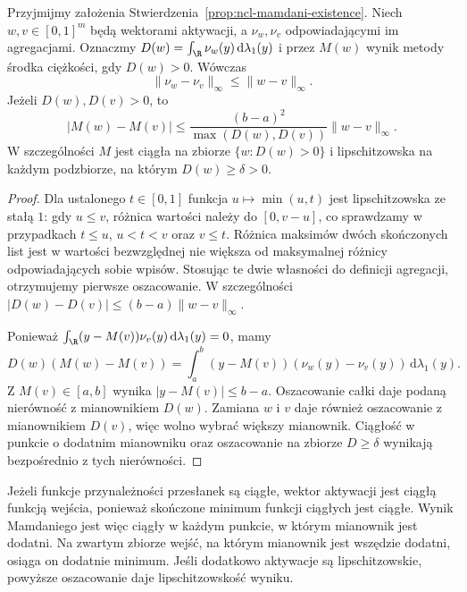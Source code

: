 \begin{twierdzenie}
\label{thm:ncl-mamdani-stability}
Przyjmijmy założenia
Stwierdzenia~\ref{prop:ncl-mamdani-existence}.
Niech $w,v\in[0,1]^m$ będą wektorami aktywacji,
a $\nu_w,\nu_v$ odpowiadającymi im agregacjami.
Oznaczmy $D(w)=\int_\R\nu_w(y)\,\mathrm d\lambda_1(y)$
i przez $M(w)$ wynik metody środka ciężkości,
gdy $D(w)>0$. Wówczas
\[
 \|\nu_w-\nu_v\|_\infty\leq\|w-v\|_\infty.
\]
Jeżeli $D(w),D(v)>0$, to
\[
 |M(w)-M(v)|
 \leq\frac{(b-a)^2}{\max(D(w),D(v))}
       \|w-v\|_\infty.
\]
W szczególności $M$ jest ciągła na zbiorze
$\{w:D(w)>0\}$ i lipschitzowska na każdym
podzbiorze, na którym $D(w)\geq\delta>0$.
\end{twierdzenie}
\begin{proof}
Dla ustalonego $t\in[0,1]$ funkcja $u\mapsto\min(u,t)$
jest lipschitzowska ze stałą $1$: gdy $u\leq v$,
różnica wartości należy do $[0,v-u]$, co sprawdzamy
w przypadkach $t\leq u$, $u<t<v$ oraz $v\leq t$.
Różnica maksimów dwóch skończonych list jest
w wartości bezwzględnej nie większa od maksymalnej
różnicy odpowiadających sobie wpisów. Stosując
te dwie własności do definicji agregacji,
otrzymujemy pierwsze oszacowanie.
W szczególności
$|D(w)-D(v)|\leq(b-a)\|w-v\|_\infty$.

Ponieważ $\int_\R (y-M(v))\nu_v(y)\,\mathrm d\lambda_1(y)=0$,
mamy
\[
 D(w)(M(w)-M(v))
 =\int_a^b(y-M(v))(\nu_w(y)-\nu_v(y))\,
          \mathrm d\lambda_1(y).
\]
Z $M(v)\in[a,b]$ wynika $|y-M(v)|\leq b-a$.
Oszacowanie całki daje podaną nierówność
z mianownikiem $D(w)$. Zamiana $w$ i $v$ daje
również oszacowanie z mianownikiem $D(v)$,
więc wolno wybrać większy mianownik.
Ciągłość w punkcie o dodatnim mianowniku
oraz oszacowanie na zbiorze $D\geq\delta$
wynikają bezpośrednio z tych nierówności.
\end{proof}
Jeżeli funkcje przynależności przesłanek są ciągłe,
wektor aktywacji jest ciągłą funkcją wejścia,
ponieważ skończone minimum funkcji ciągłych
jest ciągłe. Wynik Mamdaniego jest więc ciągły
w każdym punkcie, w którym mianownik jest dodatni.
Na zwartym zbiorze wejść, na którym mianownik
jest wszędzie dodatni, osiąga on dodatnie minimum.
Jeśli dodatkowo aktywacje są lipschitzowskie,
powyższe oszacowanie daje lipschitzowskość wyniku.

